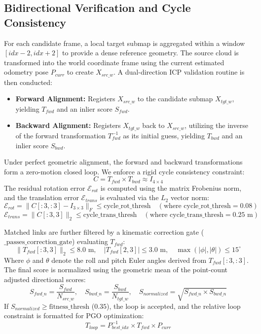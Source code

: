 \documentclass{article}
\begin{document}
\subsection{Bidirectional Verification and Cycle Consistency}
For each candidate frame, a local target submap is aggregated within a window $[idx - 2, idx + 2]$ to provide a dense reference geometry. The source cloud is transformed into the world coordinate frame using the current estimated odometry pose $P_{curr}$ to create $X_{src\_w}$.
A dual-direction ICP validation routine is then conducted:
\begin{itemize}
    \item \textbf{Forward Alignment:} Registers $X_{src\_w}$ to the candidate submap $X_{tgt\_w}$, yielding $T_{fwd}$ and an inlier score $S_{fwd}$.
    \item \textbf{Backward Alignment:} Registers $X_{tgt\_w}$ back to $X_{src\_w}$, utilizing the inverse of the forward transformation $T_{fwd}^{-1}$ as its initial guess, yielding $T_{bwd}$ and an inlier score $S_{bwd}$.
\end{itemize}
Under perfect geometric alignment, the forward and backward transformations form a zero-motion closed loop. We enforce a rigid cycle consistency constraint:
\begin{equation}
    C = T_{fwd} \times T_{bwd} \approx I_{4 \times 4}
\end{equation}
The residual rotation error $\mathcal{E}_{rot}$ is computed using the matrix Frobenius norm, and the translation error $\mathcal{E}_{trans}$ is evaluated via the $L_2$ vector norm:
\begin{equation}
    \mathcal{E}_{rot} = \|C[:3, :3] - I_{3 \times 3}\|_F \le \text{cycle\_rot\_thresh} \quad (\text{where } \text{cycle\_rot\_thresh} = 0.08)
\end{equation}
\begin{equation}
    \mathcal{E}_{trans} = \|C[:3, 3]\|_2 \le \text{cycle\_trans\_thresh} \quad (\text{where } \text{cycle\_trans\_thresh} = 0.25\text{ m})
\end{equation}

Matched links are further filtered by a kinematic correction gate ($\text{\_passes\_correction\_gate}$) evaluating $T_{fwd}$:
\begin{equation}
    \|T_{fwd}[:3, 3]\|_2 \le 8.0\text{ m}, \quad |T_{fwd}[2, 3]| \le 3.0\text{ m}, \quad \max(| \phi |, | \theta |) \le 15^\circ
\end{equation}
Where $\phi$ and $\theta$ denote the roll and pitch Euler angles derived from $T_{fwd}[:3, :3]$.
The final score is normalized using the geometric mean of the point-count adjusted directional scores:
\begin{equation}
    S_{fwd\_n} = \frac{S_{fwd}}{N_{src\_w}}, \quad S_{bwd\_n} = \frac{S_{bwd}}{N_{tgt\_w}}, \quad S_{normalized} = \sqrt{S_{fwd\_n} \times S_{bwd\_n}}
\end{equation}
If $S_{normalized} \ge \text{fitness\_thresh}$ ($0.35$), the loop is accepted, and the relative loop constraint is formatted for PGO optimization:
\begin{equation}
    T_{loop} = P_{best\_idx}^{-1} \times T_{fwd} \times P_{curr}
\end{equation}
\end{document}
